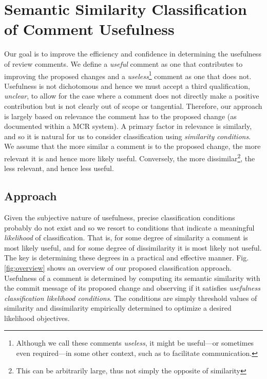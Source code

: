 
\section{Semantic Similarity Classification of Comment Usefulness}



Our goal is to improve the efficiency and confidence in determining the usefulness of review comments.
We define a \emph{useful} comment as one that contributes to improving the proposed changes and a \emph{useless}\footnote{Although we call these comments \emph{useless}, it might be useful---or sometimes even required---in some other context, such as to facilitate communication.} comment as one that does not.
Usefulness is not dichotomous and hence we must accept a third qualification, \emph{unclear}, to allow for the case where a comment does not directly make a positive contribution but is not clearly out of scope or tangential.
Therefore, our approach is largely based on relevance the comment has to the proposed change (as documented within a MCR system).
A primary factor in relevance is similarly, and so it is natural for us to consider classification using \emph{similarity conditions}\cite{Davies2012}. 
We assume that the more similar a comment is to the proposed change, the more relevant it is and hence more likely useful.
Conversely, the more dissimilar\footnote{This can be arbitrarily large, thus not simply the opposite of similarity}, the less relevant, and hence less useful.

\subsection{Approach}
Given the subjective nature of usefulness, precise classification conditions probably do not exist and so we resort to conditions that indicate a meaningful \emph{likelihood} of classification.
That is, for some degree of similarity a comment is most likely useful, and for some degree of dissimilarity it is most likely not useful.
The key is determining these degrees in a practical and effective manner.
Fig. \ref{fig:overview} shows an overview of our proposed classification approach.
Usefulness of a comment is determined by computing its semantic similarity with the commit message of its proposed change and observing if it satisfies \emph{usefulness classification likelihood conditions}.
The conditions are simply threshold values of similarity and dissimilarity empirically determined to optimize a desired likelihood objectives.


